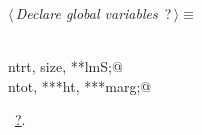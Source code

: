 \documentclass[reqno]{amsart}
\renewcommand{\NWtarget}[2]{\hypertarget{#1}{#2}}
\renewcommand{\NWlink}[2]{\hyperlink{#1}{#2}}
\begin{document}
\begin{flushleft} \small\label{scrap32}\raggedright\small
\NWtarget{nuweb?}{} $\langle\,${\itshape Declare global variables}\nobreak\ {\footnotesize {?}}$\,\rangle\equiv$
\vspace{-1ex}
\begin{list}{}{} \item
\mbox{}\verb@@\\
\mbox{}\verb@int ntrt, size, **lmS;@\\
\mbox{}\verb@double ntot, ***ht, ***marg;@\\
\mbox{}\verb@@{\NWsep}
\end{list}
\vspace{-1.5ex}
\footnotesize
\begin{list}{}{\setlength{\itemsep}{-\parsep}\setlength{\itemindent}{-\leftmargin}}
\item \NWtxtMacroRefIn\ \NWlink{nuweb?}{?}.

\item{}
\end{list}
\vspace{4ex}
\end{flushleft}
\end{document}
